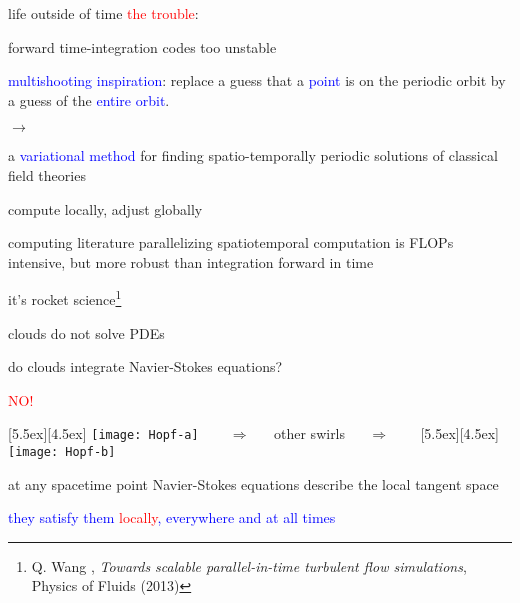 \begin{frame}{life outside of time}
\textcolor{red}{the trouble}:

forward time-integration codes too unstable

\bigskip
\bigskip

\textcolor{blue}{multishooting inspiration}:
 replace a guess that a  \textcolor{blue}{point} is on the periodic
orbit by a guess of the \textcolor{blue}{entire orbit}.

\bigskip

$\to$

\bigskip

a \textcolor{blue}{variational method} for finding
spatio-temporally periodic solutions of classical field theories
\end{frame}

\begin{frame}{compute locally, adjust globally}

\begin{block}{computing literature}
parallelizing {\color{red}spatiotemporal}
computation is FLOPs intensive, but more robust than
integration forward in time
\end{block}

\vfill\hfill
it's rocket science\footnote{{\tiny Q. Wang \etal,}
 {\tiny\em Towards scalable parallel-in-time turbulent flow simulations},
{\tiny Physics of Fluids (2013)}}
\end{frame}

\begin{frame}{clouds do not solve PDEs}

do clouds integrate Navier-Stokes equations?

\begin{center}
\centerline{\textcolor{red}{\Huge NO!}}

\begin{minipage}[t]{\textwidth}
	\begin{center}
\centerline{
\raisebox{-4.0ex}[5.5ex][4.5ex]
		 {\texttt{[image: Hopf-a]}}
~~~ $\Longrightarrow$ ~~ {other swirls} ~~ $\Longrightarrow$ ~~~
	\raisebox{-4.0ex}[5.5ex][4.5ex]
		 {\texttt{[image: Hopf-b]}}
          }
	\end{center}
\end{minipage}
\end{center}

at any spacetime point Navier-Stokes equations describe the local tangent space

\bigskip

\centerline{
\textcolor{blue}{they satisfy them \textcolor{red}{\large locally}, everywhere and at all times}
}
\end{frame}


